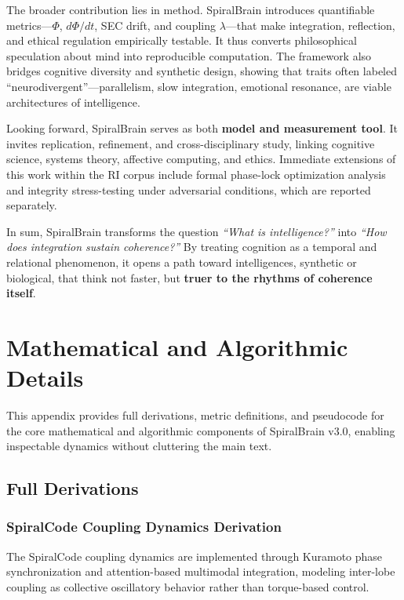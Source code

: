 \documentclass[11pt,a4paper]{article}
\begin{document}
The broader contribution lies in method.
SpiralBrain introduces quantifiable metrics---$\Phi$, $d\Phi/dt$, SEC drift, and coupling $\lambda$---that make integration, reflection, and ethical regulation empirically testable.
It thus converts philosophical speculation about mind into reproducible computation.
The framework also bridges cognitive diversity and synthetic design, showing that traits often labeled ``neurodivergent''---parallelism, slow integration, emotional resonance, are viable architectures of intelligence.

Looking forward, SpiralBrain serves as both \textbf{model and measurement tool}.
It invites replication, refinement, and cross-disciplinary study, linking cognitive science, systems theory, affective computing, and ethics.
Immediate extensions of this work within the RI corpus include formal phase-lock optimization analysis and integrity stress-testing under adversarial conditions, which are reported separately.

In sum, SpiralBrain transforms the question \textit{``What is intelligence?''} into \textit{``How does integration sustain coherence?''}
By treating cognition as a temporal and relational phenomenon, it opens a path toward intelligences, synthetic or biological, that think not faster, but \textbf{truer to the rhythms of coherence itself}.

\appendix
\section{Mathematical and Algorithmic Details}
\label{app:math}

This appendix provides full derivations, metric definitions, and pseudocode for the core mathematical and algorithmic components of SpiralBrain v3.0, enabling inspectable dynamics without cluttering the main text.

\subsection{Full Derivations}

\subsubsection{SpiralCode Coupling Dynamics Derivation}

The SpiralCode coupling dynamics are implemented through Kuramoto phase synchronization and attention-based multimodal integration, modeling inter-lobe coupling as collective oscillatory behavior rather than torque-based control.
\end{document}
